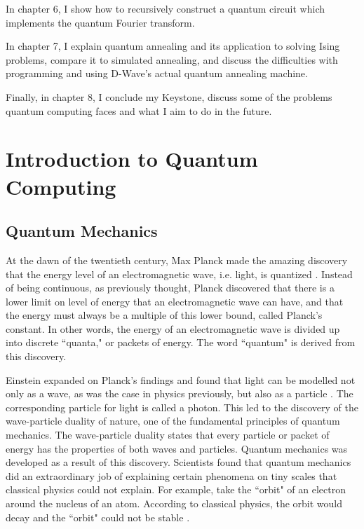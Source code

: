 \documentclass[11pt]{report}
\newcommand{\?}{\stackrel{?}{=}}
\begin{document}
In chapter 6, I show how to recursively construct a quantum circuit which implements the quantum Fourier transform.

In chapter 7, I explain quantum annealing and its application to solving Ising problems, compare it to simulated annealing, and discuss the difficulties with programming and using D-Wave's actual quantum annealing machine.

Finally, in chapter 8, I conclude my Keystone, discuss some of the problems quantum computing faces and what I aim to do in the future.

\chapter{Introduction to Quantum Computing}

\section{Quantum Mechanics}
At the dawn of the twentieth century, Max Planck made the amazing discovery that the energy level of an electromagnetic wave, i.e. light, is quantized \cite{meh01}. Instead of being continuous, as previously thought, Planck discovered that there is a lower limit on level of energy that an electromagnetic wave can have, and that the energy must always be a multiple of this lower bound, called Planck's constant. In other words, the energy of an electromagnetic wave is divided up into discrete ``quanta," or packets of energy. The word ``quantum" is derived from this discovery.

Einstein expanded on Planck’s findings and found that light can be modelled not only as a wave, as was the case in physics previously, but also as a particle \cite{ein05}. The corresponding particle for light is called a photon. This led to the discovery of the wave-particle duality of nature, one of the fundamental principles of quantum mechanics. The wave-particle duality states that every particle or packet of energy has the properties of both waves and particles. Quantum mechanics was developed as a result of this discovery. Scientists found that quantum mechanics did an extraordinary job of explaining certain phenomena on tiny scales that classical physics could not explain. For example, take the ``orbit" of an electron around the nucleus of an atom. According to classical physics, the orbit would decay and the ``orbit" could not be stable \cite{smi15}.
\end{document}
